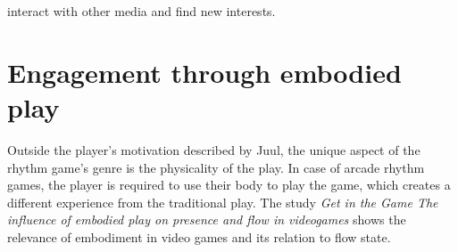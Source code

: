 interact with other media and find new interests.

\section{Engagement through embodied play}
Outside the player's motivation described by Juul, the unique aspect of the rhythm game's genre is the physicality of the play. In case of arcade rhythm games, the player is required to use their body to play the game, which creates a different experience from the traditional play. The study \textit{Get in the Game The influence of embodied play on presence and flow in videogames} shows the relevance of embodiment in video games and its relation to flow state. 